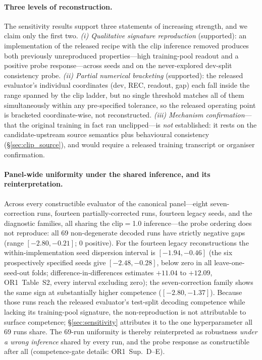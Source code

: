 \documentclass[pdflatex,sn-chicago]{sn-jnl}
\begin{document}
\paragraph{Three levels of reconstruction.}
\label{sec:three_levels}
The sensitivity results support three statements of increasing strength, and we claim only the first two. \emph{(i) Qualitative signature reproduction} (supported): an implementation of the released recipe with the clip inference removed produces both previously unreproduced properties---high training-pool readout and a positive probe response---across seeds and on the never-explored dev-split consistency probe. \emph{(ii) Partial numerical bracketing} (supported): the released evaluator's individual coordinates (dev, REC, readout, gap) each fall inside the range spanned by the clip ladder, but no single threshold matches all of them simultaneously within any pre-specified tolerance, so the released operating point is bracketed coordinate-wise, not reconstructed. \emph{(iii) Mechanism confirmation}---that the original training in fact ran unclipped---is \emph{not} established: it rests on the candidate-upstream source semantics plus behavioural consistency (\S\ref{sec:clip_source}), and would require a released training transcript or organiser confirmation.

\paragraph{Panel-wide uniformity under the shared inference, and its reinterpretation.}
\label{sec:what-drives-reversal}
Across every constructible evaluator of the canonical panel---eight seven-correction runs, fourteen partially-corrected runs, fourteen legacy seeds, and the diagnostic families, all sharing the clip$=$1.0 inference---the probe ordering does not reproduce: all 69 non-degenerate decoded runs have strictly negative gaps (range $[-2.80,-0.21]$; 0 positive). For the fourteen legacy reconstructions the within-implementation seed dispersion interval is $[-1.94,-0.46]$ (the six prospectively specified seeds give $[-2.48,-0.28]$, below zero in all leave-one-seed-out folds; difference-in-differences estimates $+11.04$ to $+12.09$, OR1~Table~S2, every interval excluding zero); the seven-correction family shows the same sign at substantially higher competence ($[-2.80,-1.37]$). Because those runs reach the released evaluator's test-split decoding competence while lacking its training-pool signature, the non-reproduction is not attributable to surface competence; \S\ref{sec:sensitivity} attributes it to the one hyperparameter all 69 runs share. The 69-run uniformity is thereby reinterpreted as robustness \emph{under a wrong inference} shared by every run, and the probe response as constructible after all (competence-gate details: OR1~Sup.~D--E).
\end{document}
